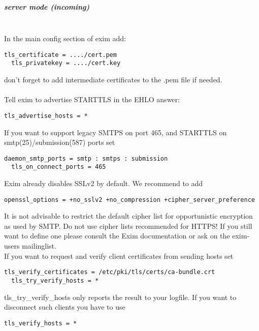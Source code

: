 \subparagraph*{server mode (incoming)}\mbox{}\\

In the main config section of exim add:

\begin{lstlisting}[breaklines]
  tls_certificate = ..../cert.pem
  tls_privatekey = ..../cert.key
\end{lstlisting}
don't forget to add intermediate certificates to the .pem file if needed.\\
\\
Tell exim to advertise STARTTLS in the EHLO answer:
\begin{lstlisting}[breaklines]
  tls_advertise_hosts = *
\end{lstlisting}

If you want to support legacy SMTPS on port 465, and STARTTLS on smtp(25)/submission(587) ports set
\begin{lstlisting}[breaklines]
  daemon_smtp_ports = smtp : smtps : submission
  tls_on_connect_ports = 465
\end{lstlisting}

Exim already disables SSLv2 by default. We recommend to add
\begin{lstlisting}[breaklines]
  openssl_options = +no_sslv2 +no_compression +cipher_server_preference
\end{lstlisting}

It is not advisable to restrict the default cipher list for opportunistic encryption as used by SMTP. Do not use cipher lists recommended for HTTPS! If you still want to define one please consult the Exim documentation or ask on the exim-users mailinglist.\\

If you want to request and verify client certificates from sending hosts set
\begin{lstlisting}[breaklines]
  tls_verify_certificates = /etc/pki/tls/certs/ca-bundle.crt
  tls_try_verify_hosts = *
\end{lstlisting}

tls\_try\_verify\_hosts only reports the result to your logfile. If you want to disconnect such clients you have to use
\begin{lstlisting}[breaklines]
  tls_verify_hosts = *
\end{lstlisting}

